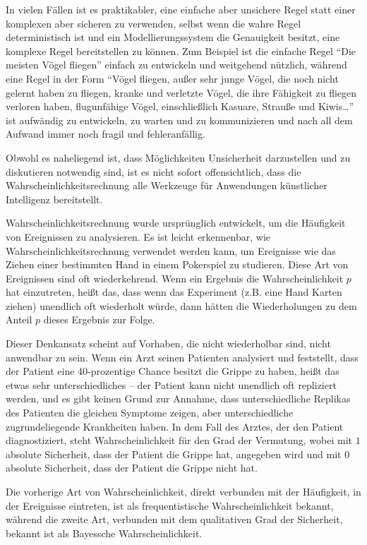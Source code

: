 In vielen Fällen ist es praktikabler, eine einfache aber unsichere Regel statt einer komplexen aber sicheren zu verwenden, selbst wenn die wahre Regel deterministisch ist und ein Modellierungssystem die Genauigkeit besitzt, eine komplexe Regel bereitstellen zu können. Zum Beispiel ist die einfache Regel ``Die meisten Vögel fliegen'' einfach zu entwickeln und weitgehend nützlich, während eine Regel in der Form ``Vögel fliegen, außer sehr junge Vögel, die noch nicht gelernt haben zu fliegen, kranke und verletzte Vögel, die ihre Fähigkeit zu fliegen verloren haben, flugunfähige Vögel, einschließlich Kasuare, Strauße und Kiwis\dots'' ist aufwändig zu entwickeln, zu warten und zu kommunizieren und nach all dem Aufwand immer noch fragil und fehleranfällig.

Obwohl es naheliegend ist, dass Möglichkeiten Unsicherheit darzustellen und zu diskutieren notwendig sind, ist es nicht sofort offensichtlich, dass die Wahrscheinlichkeitsrechnung alle Werkzeuge für Anwendungen künstlicher Intelligenz bereitstellt.

Wahrscheinlichkeitsrechnung wurde ursprünglich entwickelt, um die Häufigkeit von Ereignissen zu analysieren. Es ist leicht erkennenbar, wie Wahrscheinlichkeitsrechnung verwendet werden kann, um Ereignisse wie das Ziehen einer bestimmten Hand in einem Pokerspiel zu studieren. Diese Art von Ereignissen sind oft wiederkehrend. Wenn ein Ergebnis die Wahrscheinlichkeit $p$ hat einzutreten, heißt das, dass wenn das Experiment (z.B. eine Hand Karten ziehen) unendlich oft wiederholt würde, dann hätten die Wiederholungen zu dem Anteil $p$ dieses Ergebnis zur Folge.

Dieser Denkansatz scheint auf Vorhaben, die nicht wiederholbar sind, nicht anwendbar zu sein. Wenn ein Arzt seinen Patienten analysiert und feststellt, dass der Patient eine 40-prozentige Chance besitzt die Grippe zu haben, heißt das etwas sehr unterschiedliches -- der Patient kann nicht unendlich oft repliziert werden, und es gibt keinen Grund zur Annahme, dass unterschiedliche Replikas des Patienten die gleichen Symptome zeigen, aber unterschiedliche zugrundeliegende Krankheiten haben. In dem Fall des Arztes, der den Patient diagnostiziert, steht Wahrscheinlichkeit für den Grad der Vermutung, wobei mit $1$ absolute Sicherheit, dass der Patient die Grippe hat, angegeben wird und mit $0$ absolute Sicherheit, dass der Patient die Grippe nicht hat.

Die vorherige Art von Wahrscheinlichkeit, direkt verbunden mit der Häufigkeit, in der Ereignisse eintreten, ist als frequentistische Wahrscheinlichkeit bekannt, während die zweite Art, verbunden mit dem qualitativen Grad der Sicherheit, bekannt ist als Bayessche Wahrscheinlichkeit.
\cite{goodfellow2016deeplearning}

